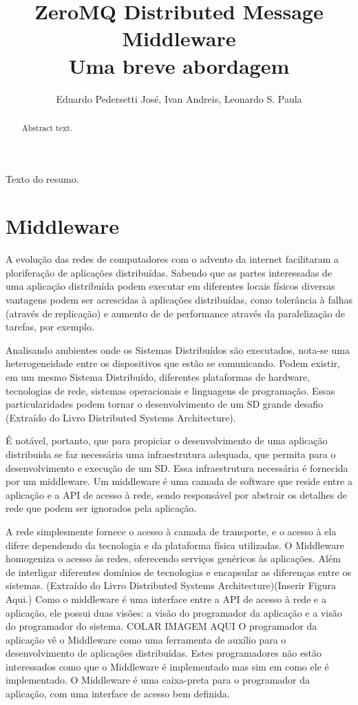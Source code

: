 \documentclass[12pt]{article}
\title{ZeroMQ Distributed Message Middleware\\Uma breve abordagem}
\author{Eduardo Pedersetti José\inst{1}, Ivan Andreis\inst{1}, Leonardo S. Paula\inst{1}}
\begin{document}
 

\maketitle

\begin{abstract}
  Abstract text.
\end{abstract}
     
\begin{resumo} 
  Texto do resumo.
\end{resumo}

\section{Middleware}
A evolução das redes de computadores com o advento da internet facilitaram a ploriferação 
de aplicações distribuídas. Sabendo que as partes interessadas de uma aplicação
distribuída podem executar em diferentes locais físicos diversas vantagens podem ser
acrescidas à aplicações distribuídas, como tolerância à falhas (através de replicação) e
aumento de de performance através da paralelização de tarefas, por exemplo.

Analisando ambientes onde os Sistemas Distribuídos são executados, nota-se uma
heterogeneidade entre os dispositivos que estão se comunicando. Podem existir, em um 
mesmo Sistema Distribuído, diferentes plataformas de hardware, tecnologias de rede,
sistemas operacionais e linguagens de programação. Essas particularidades podem tornar o
desenvolvimento de um SD grande desafio  (Extraído do Livro Distributed Systems
Architecture).

É notável, portanto, que para propiciar o desenvolvimento de uma aplicação distribuida se
faz necessária uma infraestrutura adequada, que permita para o desenvolvimento e execução
de um SD. Essa infraestrutura necessária é fornecida por um middleware. Um middleware é
uma camada de software que reside entre a aplicação e a API de acesso à rede, sendo
responsável por abstrair os detalhes de rede que podem ser ignorados pela aplicação.

A rede simplesmente fornece o acesso à camada de transporte, e o acesso à ela difere
dependendo da tecnologia e da plataforma física utilizadas. O Middleware homogeniza o
acesso às redes, oferecendo serviços genéricos às aplicações. Além de interligar
diferentes domínios de tecnologias e encapsular as diferenças entre os sistemas. (Extraído
do Livro Distributed Systems Architecture)(Inserir Figura Aqui.)
Como o middleware é uma interface entre a API de acesso à rede e a aplicação, ele possui
duas visões: a visão do programador da aplicação e a visão do programador do sistema.
COLAR IMAGEM AQUI
O programador da aplicação vê o Middleware como uma ferramenta de auxílio para o
desenvolvimento de aplicações distribuídas. Estes programadores não estão interessados
como que o Middleware é implementado mas sim em como ele é implementado. O Middleware é
uma caixa-preta para o programador da aplicação, com uma interface de acesso bem definida.
\end{document}
